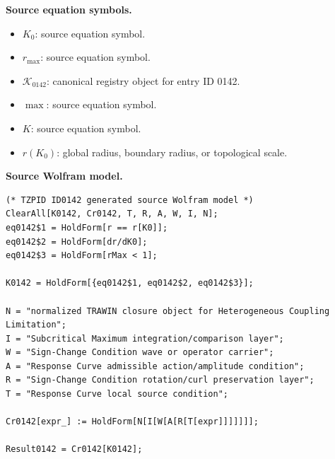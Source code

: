 \begin{minipage}[t]{0.49\linewidth}
\begingroup
\small
\raggedright
\textbf{Source equation symbols.}\par
\begin{itemize}[leftmargin=1.35em,itemsep=1pt,topsep=1pt,parsep=0pt]
    \item $K_0$: source equation symbol.
    \item $r_{\max}$: source equation symbol.
    \item $\mathcal{K}_{0142}$: canonical registry object for entry ID 0142.
    \item $\max$: source equation symbol.
    \item $K$: source equation symbol.
    \item $r(K_0)$: global radius, boundary radius, or topological scale.
\end{itemize}
\endgroup
\end{minipage}\hfill
\begin{minipage}[t]{0.47\linewidth}
\begingroup
\scriptsize
\raggedright
\textbf{Source Wolfram model.}\par
\begin{Verbatim}[fontsize=\tiny,breaklines=true,breakanywhere=true]
(* TZPID ID0142 generated source Wolfram model *)
ClearAll[K0142, Cr0142, T, R, A, W, I, N];
eq0142$1 = HoldForm[r == r[K0]];
eq0142$2 = HoldForm[dr/dK0];
eq0142$3 = HoldForm[rMax < 1];

K0142 = HoldForm[{eq0142$1, eq0142$2, eq0142$3}];

N = "normalized TRAWIN closure object for Heterogeneous Coupling Limitation";
I = "Subcritical Maximum integration/comparison layer";
W = "Sign-Change Condition wave or operator carrier";
A = "Response Curve admissible action/amplitude condition";
R = "Sign-Change Condition rotation/curl preservation layer";
T = "Response Curve local source condition";

Cr0142[expr_] := HoldForm[N[I[W[A[R[T[expr]]]]]]];

Result0142 = Cr0142[K0142];
\end{Verbatim}
\endgroup
\end{minipage}

